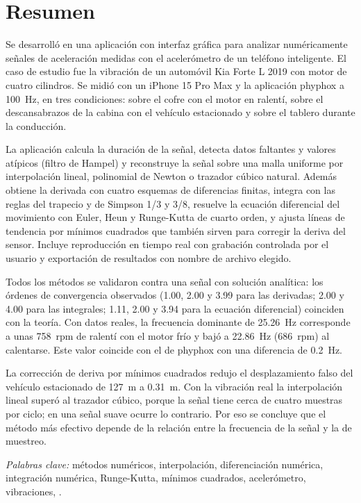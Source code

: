 \section*{Resumen}

Se desarrolló en \matlab{} una aplicación con interfaz gráfica para analizar numéricamente señales de aceleración medidas con el acelerómetro de un teléfono inteligente. El caso de estudio fue la vibración de un automóvil Kia Forte L 2019 con motor de cuatro cilindros. Se midió con un iPhone 15 Pro Max y la aplicación phyphox a 100~Hz, en tres condiciones: sobre el cofre con el motor en ralentí, sobre el descansabrazos de la cabina con el vehículo estacionado y sobre el tablero durante la conducción.

La aplicación calcula la duración de la señal, detecta datos faltantes y valores atípicos (filtro de Hampel) y reconstruye la señal sobre una malla uniforme por interpolación lineal, polinomial de Newton o trazador cúbico natural. Además obtiene la derivada con cuatro esquemas de diferencias finitas, integra con las reglas del trapecio y de Simpson 1/3 y 3/8, resuelve la ecuación diferencial del movimiento con Euler, Heun y Runge-Kutta de cuarto orden, y ajusta líneas de tendencia por mínimos cuadrados que también sirven para corregir la deriva del sensor. Incluye reproducción en tiempo real con grabación controlada por el usuario y exportación de resultados con nombre de archivo elegido.

Todos los métodos se validaron contra una señal con solución analítica: los órdenes de convergencia observados (1.00, 2.00 y 3.99 para las derivadas; 2.00 y 4.00 para las integrales; 1.11, 2.00 y 3.94 para la ecuación diferencial) coinciden con la teoría. Con datos reales, la frecuencia dominante de 25.26~Hz corresponde a unas 758~rpm de ralentí con el motor frío y bajó a 22.86~Hz (686~rpm) al calentarse. Este valor coincide con el de phyphox con una diferencia de 0.2~Hz.

La corrección de deriva por mínimos cuadrados redujo el desplazamiento falso del vehículo estacionado de 127~m a 0.31~m. Con la vibración real la interpolación lineal superó al trazador cúbico, porque la señal tiene cerca de cuatro muestras por ciclo; en una señal suave ocurre lo contrario. Por eso se concluye que el método más efectivo depende de la relación entre la frecuencia de la señal y la de muestreo.

\textit{Palabras clave:} métodos numéricos, interpolación, diferenciación numérica, integración numérica, Runge-Kutta, mínimos cuadrados, acelerómetro, vibraciones, \matlab{}.

\clearpage
